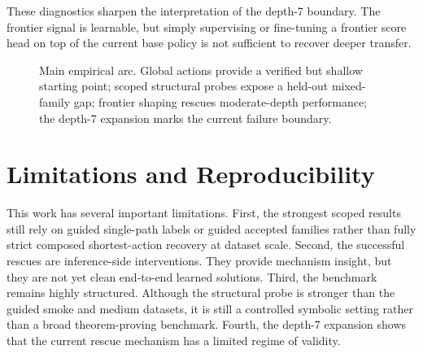 \documentclass[11pt]{article}
\newcommand{\staticKAN}{Static KAN}
\begin{document}
These diagnostics sharpen the interpretation of the depth-7 boundary. The frontier signal is learnable, but simply supervising or fine-tuning a frontier score head on top of the current base policy is not sufficient to recover deeper transfer.

\begin{figure}[t]
\centering
{}
\caption{Main empirical arc. Global actions provide a verified but shallow starting point; scoped structural probes expose a held-out mixed-family gap; frontier shaping rescues moderate-depth performance; the depth-7 expansion marks the current failure boundary.}
\label{fig:main-summary}
\end{figure}

\section{Limitations and Reproducibility}

This work has several important limitations. First, the strongest scoped results still rely on guided single-path labels or guided accepted families rather than fully strict composed shortest-action recovery at dataset scale. Second, the successful rescues are inference-side interventions. They provide mechanism insight, but they are not yet clean end-to-end learned solutions. Third, the benchmark remains highly structured. Although the structural probe is stronger than the guided smoke and medium datasets, it is still a controlled symbolic setting rather than a broad theorem-proving benchmark. Fourth, the depth-7 expansion shows that the current rescue mechanism has a limited regime of validity.
\end{document}
